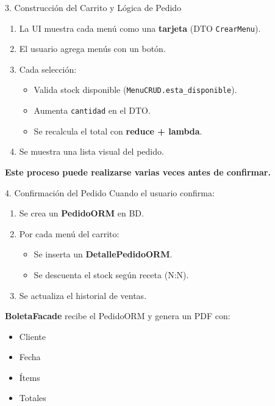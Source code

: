 \documentclass{beamer}
\begin{document}
\begin{frame}{3. Construcción del Carrito y Lógica de Pedido}
\begin{enumerate}
    \item La UI muestra cada menú como una \textbf{tarjeta} (DTO \texttt{CrearMenu}).
    \item El usuario agrega menús con un botón.
    \item Cada selección:
    \begin{itemize}
        \item Valida stock disponible (\texttt{MenuCRUD.esta\_disponible}).
        \item Aumenta \texttt{cantidad} en el DTO.
        \item Se recalcula el total con \textbf{reduce + lambda}.
    \end{itemize}
    \item Se muestra una lista visual del pedido.
\end{enumerate}

\bigskip
\textbf{Este proceso puede realizarse varias veces antes de confirmar.}
\end{frame}

\begin{frame}{4. Confirmación del Pedido}
Cuando el usuario confirma:

\begin{enumerate}
    \item Se crea un \textbf{PedidoORM} en BD.
    \item Por cada menú del carrito:
    \begin{itemize}
        \item Se inserta un \textbf{DetallePedidoORM}.
        \item Se descuenta el stock según receta (N:N).
    \end{itemize}
    \item Se actualiza el historial de ventas.
\end{enumerate}

\bigskip
\textbf{BoletaFacade} recibe el PedidoORM y genera un PDF con:
\begin{itemize}
    \item Cliente
    \item Fecha
    \item Ítems
    \item Totales
\end{itemize}
\end{frame}
\end{document}
